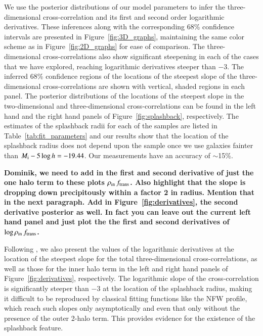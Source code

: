 \documentclass[iop, apjl, twocolappendix, numberedappendix]{emulateapj}
\begin{document}
We use the posterior distributions of our model parameters to infer
the three-dimensional cross-correlation and its first and second order logarithmic
derivatives. These inferences along with the corresponding 68\%
confidence intervals are presented in Figure~\ref{fig:3D_graphs},
maintaining the same color scheme as in Figure~\ref{fig:2D_graphs}
for ease of comparison. The three-dimensional cross-correlations
also show significant steepening in each of the cases that we have
explored, reaching logarithmic derivatives steeper than $-3$. The
inferred 68\% confidence regions of the locations of the steepest
slope of the three-dimensional cross-correlations are shown with
vertical, shaded regions in each panel. The posterior
distributions of the locations of the steepest slope in the
two-dimensional and three-dimensional cross-correlations can be
found in the left hand and the right hand panels of
Figure~\ref{fig:splashback}, respectively. The estimates of the splashback radii
for each of the samples are listed in Table~\ref{tab:fit_parameters}
and our results show that the location of the splashback radius does
not depend upon the sample once we use galaxies fainter than $M_{\rm
i}-5\log h=-19.44$. Our measurements have an accuracy of $\sim$15\%.

{\bf Dominik, we need to add in the first and second derivative of just the one
halo term to these plots $\rho_{\rm in}\,f_{\rm trans}$. Also highlight that
the slope is dropping down precipitously within a factor 2 in radius. Mention
that in the next paragraph. Add in Figure~\ref{fig:derivatives}, the second
derivative posterior as well. In fact you can leave out the current left hand
panel and just plot the the first and second derivatives of $\log\rho_{\rm
in}\,f_{\rm trans}$.}

Following \citet{baxter2017halo}, we also present the values of the
logarithmic derivatives at the location of the steepest slope for
the total three-dimensional cross-correlations, as well as those for
the inner halo term in the left and right hand panels of
Figure~\ref{fig:derivatives}, respectively. The logarithmic slope of the 
cross-correlation is significantly steeper than $-3$ at the location 
of the splashback radius, making it difficult to
be reproduced by classical fitting functions like the NFW profile,
which reach such slopes only asymptotically and even that only
without the presence of the outer 2-halo term. This provides
evidence for the existence of the splashback feature.
\end{document}
